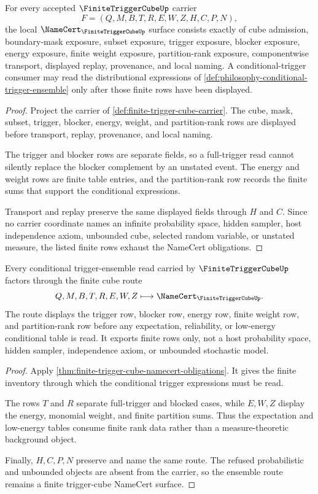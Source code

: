 \begin{theorem}
\label{thm:finite-trigger-cube-namecert-obligations}
For every accepted $\FiniteTriggerCubeUp$ carrier
$$
F=(Q,M,B,T,R,E,W,Z,H,C,P,N),
$$
the local $\NameCert_{\FiniteTriggerCubeUp}$ surface consists exactly of cube admission, boundary-mask exposure, subset exposure, trigger exposure, blocker exposure, energy exposure, finite weight exposure, partition-rank exposure, componentwise transport, displayed replay, provenance, and local naming. A conditional-trigger consumer may read the distributional expressions of \autoref{def:philosophy-conditional-trigger-ensemble} only after those finite rows have been displayed.
\end{theorem}
\begin{proof}
Project the carrier of \autoref{def:finite-trigger-cube-carrier}. The cube, mask, subset, trigger, blocker, energy, weight, and partition-rank rows are displayed before transport, replay, provenance, and local naming.

The trigger and blocker rows are separate fields, so a full-trigger read cannot silently replace the blocker complement by an unstated event. The energy and weight rows are finite table entries, and the partition-rank row records the finite sums that support the conditional expressions.

Transport and replay preserve the same displayed fields through $H$ and $C$. Since no carrier coordinate names an infinite probability space, hidden sampler, host independence axiom, unbounded cube, selected random variable, or unstated measure, the listed finite rows exhaust the NameCert obligations.
\end{proof}

\begin{theorem}
\label{thm:finite-trigger-cube-ensemble-route}
Every conditional trigger-ensemble read carried by $\FiniteTriggerCubeUp$ factors through the finite cube route
$$
Q,M,B,T,R,E,W,Z \longmapsto \NameCert_{\FiniteTriggerCubeUp}.
$$
The route displays the trigger row, blocker row, energy row, finite weight row, and partition-rank row before any expectation, reliability, or low-energy conditional table is read. It exports finite rows only, not a host probability space, hidden sampler, independence axiom, or unbounded stochastic model.
\end{theorem}
\begin{proof}
Apply \autoref{thm:finite-trigger-cube-namecert-obligations}. It gives the finite inventory through which the conditional trigger expressions must be read.

The rows $T$ and $R$ separate full-trigger and blocked cases, while $E,W,Z$ display the energy, monomial weight, and finite partition sums. Thus the expectation and low-energy tables consume finite rank data rather than a measure-theoretic background object.

Finally, $H,C,P,N$ preserve and name the same route. The refused probabilistic and unbounded objects are absent from the carrier, so the ensemble route remains a finite trigger-cube NameCert surface.
\end{proof}

